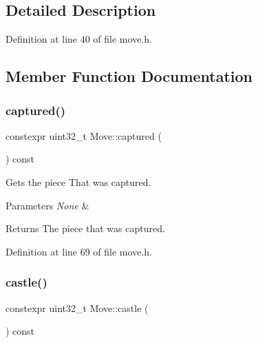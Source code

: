 \subsection{Detailed Description}


Definition at line 40 of file move.\+h.



\subsection{Member Function Documentation}
\mbox{\label{classMove_a5a8811a7e6ee7fe36675d49038f2ea2b}} 
\subsubsection{\texorpdfstring{captured()}{captured()}}
{\footnotesize\ttfamily constexpr uint32\+\_\+t Move\+::captured (\begin{DoxyParamCaption}{ }\end{DoxyParamCaption}) const\hspace{0.3cm}{\ttfamily [inline]}}



Gets the piece That was captured. 


\begin{DoxyParams}{Parameters}
{\em None} & \\
\hline
\end{DoxyParams}
\begin{DoxyReturn}{Returns}
The piece that was captured. 
\end{DoxyReturn}


Definition at line 69 of file move.\+h.

\mbox{\label{classMove_a35d7341c2a9074102451bf4df0d8b4c2}} 
\subsubsection{\texorpdfstring{castle()}{castle()}}
{\footnotesize\ttfamily constexpr uint32\+\_\+t Move\+::castle (\begin{DoxyParamCaption}{ }\end{DoxyParamCaption}) const\hspace{0.3cm}{\ttfamily [inline]}}



